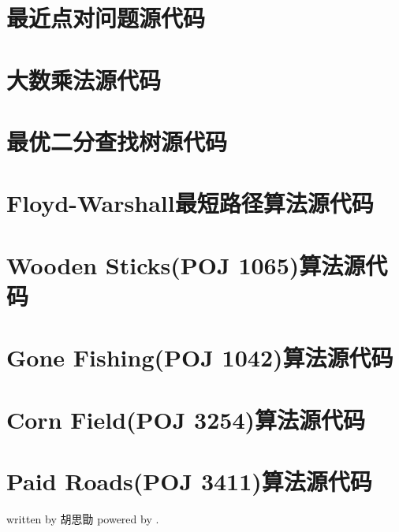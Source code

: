 \documentclass{report}
\begin{document}
\section{最近点对问题源代码}
\label{cha:zui_jin_dian_dui_wen_ti_yuan_dai_ma_}

\section{大数乘法源代码}
\label{cha:da_shu_cheng_fa_yuan_dai_ma_}

\section{最优二分查找树源代码}
\label{cha:zui_you_er_fen_cha_zhao_shu_yuan_dai_ma_}

\section{Floyd-Warshall最短路径算法源代码}
\label{sec:floyd_warshallzui_duan_lu_jing_suan_fa_yuan_dai_ma_}

\section{Wooden Sticks(POJ 1065)算法源代码}
\label{sec:wooden_sticks_poj_1065_suan_fa_yuan_dai_ma_}

\section{Gone Fishing(POJ 1042)算法源代码}
\label{sec:gone_fishing_poj_1042_suan_fa_yuan_dai_ma_}

\section{Corn Field(POJ 3254)算法源代码}
\label{sec:corn_field_poj_3254_suan_fa_yuan_dai_ma_}

\section{Paid Roads(POJ 3411)算法源代码}
\label{sec:paid_roads_poj_3411_suan_fa_yuan_dai_ma_}

\vfill
{\tiny written by 胡思勖 \hfill powered by \XeLaTeX .}
\end{document}
